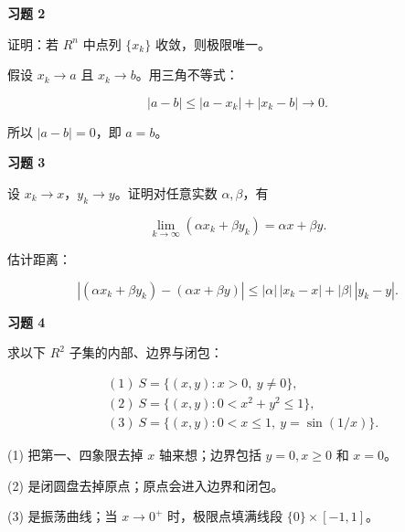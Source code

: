 \begin{exercisebox}
\textbf{习题 2}

证明：若 \(R^n\) 中点列 \(\{x_k\}\) 收敛，则极限唯一。

\begin{hintbox}
假设 \(x_k\to a\) 且 \(x_k\to b\)。用三角不等式：

\[
          |a-b|\le |a-x_k|+|x_k-b|\to 0.
        \]

所以 \(|a-b|=0\)，即 \(a=b\)。
\end{hintbox}
\end{exercisebox}

\begin{exercisebox}
\textbf{习题 3}

设 \(x_k\to x\)，\(y_k\to y\)。证明对任意实数 \(\alpha,\beta\)，有

\[
        \lim_{k\to\infty}(\alpha x_k+\beta y_k)=\alpha x+\beta y.
      \]

\begin{hintbox}
估计距离：

\[
          |(\alpha x_k+\beta y_k)-(\alpha x+\beta y)|
          \le |\alpha|\,|x_k-x|+|\beta|\,|y_k-y|.
        \]
\end{hintbox}
\end{exercisebox}

\begin{exercisebox}
\textbf{习题 4}

求以下 \(R^2\) 子集的内部、边界与闭包：

\[
        \begin{aligned}
        &(1)\ S=\{(x,y):x>0,\ y\ne0\},\\
        &(2)\ S=\{(x,y):0<x^2+y^2\le1\},\\
        &(3)\ S=\{(x,y):0<x\le1,\ y=\sin(1/x)\}.
        \end{aligned}
      \]

\begin{hintbox}
(1) 把第一、四象限去掉 \(x\) 轴来想；边界包括 \(y=0,x\ge0\) 和 \(x=0\)。

(2) 是闭圆盘去掉原点；原点会进入边界和闭包。

(3) 是振荡曲线；当 \(x\to0^+\) 时，极限点填满线段 \(\{0\}\times[-1,1]\)。
\end{hintbox}
\end{exercisebox}

